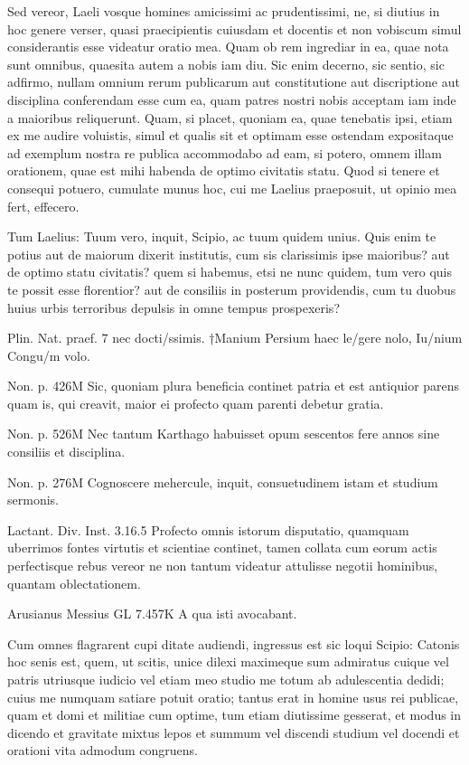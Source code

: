  Sed vereor, Laeli vosque homines amicissimi ac prudentissimi, ne, si diutius in hoc genere verser, quasi praecipientis cuiusdam et docentis et non vobiscum simul considerantis esse videatur oratio mea. Quam ob rem ingrediar in ea, quae nota sunt omnibus, quaesita autem a nobis iam diu. Sic enim decerno, sic sentio, sic adfirmo, nullam omnium rerum publicarum aut constitutione aut discriptione aut disciplina conferendam esse cum ea, quam patres nostri nobis acceptam iam inde a maioribus reliquerunt. Quam, si placet, quoniam ea, quae tenebatis ipsi, etiam ex me audire voluistis, simul et qualis sit et optimam esse ostendam expositaque ad exemplum nostra re publica accommodabo ad eam, si potero, omnem illam orationem, quae est mihi habenda de optimo civitatis statu. Quod si tenere et consequi potuero, cumulate munus hoc, cui me Laelius praeposuit, ut opinio mea fert, effecero.

 Tum Laelius: Tuum vero, inquit, Scipio, ac tuum quidem unius. Quis enim te potius aut de maiorum dixerit institutis, cum sis clarissimis ipse maioribus? aut de optimo statu civitatis? quem si habemus, etsi ne nunc quidem, tum vero quis te possit esse florentior? aut de consiliis in posterum providendis, cum tu duobus huius urbis terroribus depulsis in omne tempus prospexeris?

 Plin. Nat. praef. 7 nec docti/ssimis. †Manium Persium haec le/gere nolo, Iu/nium Congu/m volo.

 Non. p. 426M Sic, quoniam plura beneficia continet patria et est antiquior parens quam is, qui creavit, maior ei profecto quam parenti debetur gratia.

 Non. p. 526M Nec tantum Karthago habuisset opum sescentos fere annos sine consiliis et disciplina.

 Non. p. 276M Cognoscere mehercule, inquit, consuetudinem istam et studium sermonis.

 Lactant. Div. Inst. 3.16.5 Profecto omnis istorum disputatio, quamquam uberrimos fontes virtutis et scientiae continet, tamen collata cum eorum actis perfectisque rebus vereor ne non tantum videatur attulisse negotii hominibus, quantam oblectationem.

 Arusianus Messius GL 7.457K A qua isti avocabant.

 Cum omnes flagrarent cupi ditate audiendi, ingressus est sic loqui Scipio: Catonis hoc senis est, quem, ut scitis, unice dilexi maximeque sum admiratus cuique vel patris utriusque iudicio vel etiam meo studio me totum ab adulescentia dedidi; cuius me numquam satiare potuit oratio; tantus erat in homine usus rei publicae, quam et domi et militiae cum optime, tum etiam diutissime gesserat, et modus in dicendo et gravitate mixtus lepos et summum vel discendi studium vel docendi et orationi vita admodum congruens.

